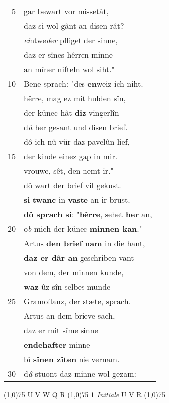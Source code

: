 \documentclass[8pt,a4paper,notitlepage]{article}
\begin{document}
\begin{table}[ht]
\begin{minipage}[t]{0.5\linewidth}
\begin{tabular}{rl}
5 & gar bewart vor missetât,\\ 
 & daz si wol gânt an disen rât?\\ 
 & \textit{ei}ntwe\textit{d}e\textit{r} pfliget der sinne,\\ 
 & daz er sînes hêrren minne\\ 
 & an mîner nifteln wol siht."\\ 
10 & Bene sprach: "des \textbf{en}weiz ich niht.\\ 
 & hêrre, mag ez mit hulden sîn,\\ 
 & der künec hât \textbf{diz} vingerlîn\\ 
 & d\textit{â} her gesant und disen brief.\\ 
 & dô ich nû vür daz pavelûn lief,\\ 
15 & der kinde einez gap in mir.\\ 
 & vrouwe, sêt, den nemt ir."\\ 
 & dô wart der brief vil gekust.\\ 
 & \textbf{si} \textbf{twanc} in \textbf{vaste} an ir brust.\\ 
 & \textbf{dô sprach si}: "\textbf{hêrre}, sehet \textbf{her} an,\\ 
20 & o\textit{b} mich der künec \textbf{minnen kan}."\\ 
 & Artus \textbf{den brief nam} in die hant,\\ 
 & \textbf{daz er dâr an} geschriben vant\\ 
 & von dem, der minnen kunde,\\ 
 & \textbf{waz} ûz sîn selbes munde\\ 
25 & Gramoflanz, der stæte, sprach.\\ 
 & Artus an dem brieve sach,\\ 
 & daz er mit sîme sinne\\ 
 & \textbf{endehafter} minne\\ 
 & bî \textbf{sînen zîten} nie vernam.\\ 
30 & d\textit{â} stuont daz minne wol gezam:\\ 
\end{tabular}
\scriptsize
\line(1,0){75} \newline
U V W Q R \newline
\line(1,0){75} \newline
\textbf{1} \textit{Initiale} U V R  \newline
\line(1,0){75} \newline

\end{minipage}
\end{table}
\end{document}
